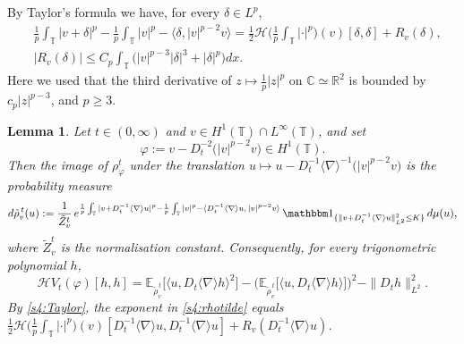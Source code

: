 \documentclass[letterpaper, 11pt,  reqno]{amsart}
\newtheorem{lemma}[theorem]{Lemma}
\theoremstyle{definition}
\newcommand{\1}{\mathbbm 1}
\newcommand{\R}{\mathbb{R}}
\newcommand{\C}{\mathbb{C}}
\newcommand{\T}{\mathbb{T}}
\renewcommand{\H}{\mathcal H}
\newcommand{\0}{\mathbf 0}
\newcommand{\E}{\mathbb{E}}
\newcommand{\dl}{\delta}
\newcommand{\nb}{\nabla}
\newcommand{\jb}[1]
{\langle #1 \rangle}
\newcommand{\ind}{\mathbbm 1}
\newcommand{\ph}{\varphi}
\renewcommand{\H}{\mathcal{H}}
\numberwithin{equation}{section}
\numberwithin{theorem}{section}
\newcommand{\HF}[2]{\mathcal H\big(\tfrac1p{\textstyle\int_\T}|\cdot|^p\big)(#1)[#2]}
\newcommand{\WV}[1]{e^{\frac1p\int_\T|#1+D_t^{-1}\jb\nb u|^p-\frac1p\int_\T|#1|^p-\langle D_t^{-1}\jb\nb u,\,|#1|^{p-2}#1\rangle}\,\ind_{\{\|#1+D_t^{-1}\jb\nb u\|_{L^2}^2\le K\}}}
\begin{document}
By Taylor's formula we have, for every $\dl\in L^p$,
\begin{equation}\label{s4:Taylor}
\begin{aligned}
&\frac1p\int_\T|v+\dl|^p-\frac1p\int_\T|v|^p-\big\langle\dl,|v|^{p-2}v\big\rangle
=\frac12\HF{v}{\dl,\dl}+R_v(\dl),\\
&|R_v(\dl)|\le C_p\int_\T\big(|v|^{p-3}|\dl|^3+|\dl|^p\big)dx .
\end{aligned}
\end{equation}
Here we used that the third derivative of $z\mapsto\frac1p|z|^p$ on $\C\simeq\R^2$
is bounded by $c_p|z|^{p-3}$, and $p\ge3$.

\begin{lemma}\label{s4:LEM:recentre}
Let $t\in(0,\infty)$ and $v\in H^1(\T)\cap L^\infty(\T)$, and set
\begin{equation}\label{s4:phiv}
\ph:=v-D_t^{-2}\big(|v|^{p-2}v\big)\in H^1(\T).
\end{equation}
Then the image of $\rho^t_\ph$ under the translation
$u\mapsto u-D_t^{-1}\jb\nb^{-1}\big(|v|^{p-2}v\big)$ is the probability measure
\begin{equation}\label{s4:rhotilde}
d\tilde\rho^{\,t}_v(u):=\frac1{\tilde Z^t_v}\,\WV{v}\,d\mu(u),
\end{equation}
where $\tilde Z^t_v$ is the normalisation constant. Consequently, for every
trigonometric polynomial $h$,
\begin{equation}\label{s4:Hessv}
\H V_t(\ph)[h,h]
=\E_{\tilde\rho^{\,t}_v}\big[\jb{u,D_t\jb\nb h}^2\big]-\Big(\E_{\tilde\rho^{\,t}_v}\big[\jb{u,D_t\jb\nb h}\big]\Big)^2-\|D_th\|_{L^2}^2 .
\end{equation}
By \eqref{s4:Taylor}, the exponent in \eqref{s4:rhotilde} equals
$\frac12\HF{v}{D_t^{-1}\jb\nb u,D_t^{-1}\jb\nb u}+R_v(D_t^{-1}\jb\nb u)$.
\end{lemma}
 
\end{document}

